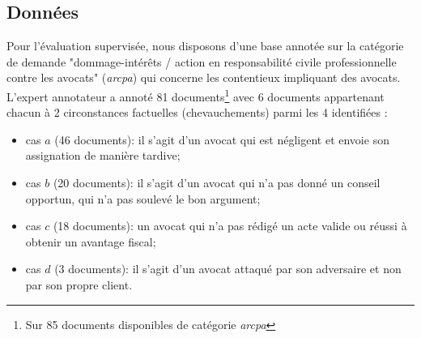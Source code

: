\subsection{Données}
Pour l'évaluation supervisée, nous disposons d'une base annotée sur la catégorie de demande "dommage-intérêts / action en responsabilité civile professionnelle contre les avocats" (\textit{arcpa}) qui concerne les contentieux impliquant des avocats.  L'expert annotateur a annoté 81 documents\footnote{Sur 85 documents disponibles de catégorie \textit{arcpa}} avec 6 documents appartenant chacun à 2 circonstances factuelles (chevauchements) parmi les 4 identifiées :
\begin{itemize}
\item cas $a$ (46 documents): il s'agit d'un avocat qui est négligent et envoie son assignation de manière tardive; %
\item cas $b$ (20 documents): il s'agit d'un avocat qui n'a pas donné un conseil opportun, qui n'a pas soulevé le bon argument;
\item cas $c$ (18 documents): un avocat qui n'a pas rédigé un acte valide ou réussi à obtenir un avantage fiscal; %
\item cas $d$ (3 documents): il s'agit d'un avocat attaqué par son adversaire et non par son propre client.
\end{itemize}



